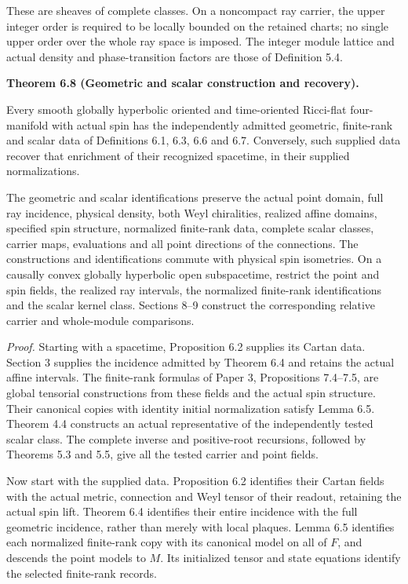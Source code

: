 \documentclass[
  english,
  11pt,
  reqno]{amsart}
\makeatletter
\newcommand{\pandocstatementheading}[1]{%
  \par\if@nobreak\else
    \addpenalty{\@beginparpenalty}%
    \addvspace{.5\baselineskip plus .2\baselineskip minus .2\baselineskip}%
  \fi
  {\normalfont\bfseries #1\par}%
  \nobreak\@afterindenttrue\@afterheading
}
\makeatother
\begin{document}
These are sheaves of complete classes. On a noncompact ray carrier, the
upper integer order is required to be locally bounded on the retained
charts; no single upper order over the whole ray space is imposed. The
integer module lattice and actual density and phase-transition factors
are those of Definition 5.4.

\pandocstatementheading{\protect{}\label{thm:global-geometric-scalar-recovery}Theorem 6.8 (Geometric and scalar construction and recovery).}

Every smooth globally hyperbolic oriented and time-oriented Ricci-flat
four-manifold with actual spin has the independently admitted geometric,
finite-rank and scalar data of Definitions 6.1, 6.3, 6.6 and 6.7.
Conversely, such supplied data recover that enrichment of their
recognized spacetime, in their supplied normalizations.

The geometric and scalar identifications preserve the actual point
domain, full ray incidence, physical density, both Weyl chiralities,
realized affine domains, specified spin structure, normalized
finite-rank data, complete scalar classes, carrier maps, evaluations and
all point directions of the connections. The constructions and
identifications commute with physical spin isometries. On a causally
convex globally hyperbolic open subspacetime, restrict the point and
spin fields, the realized ray intervals, the normalized finite-rank
identifications and the scalar kernel class. Sections 8--9 construct the
corresponding relative carrier and whole-module comparisons.

\emph{Proof.} Starting with a spacetime, Proposition 6.2 supplies its
Cartan data. Section 3 supplies the incidence admitted by Theorem 6.4
and retains the actual affine intervals. The finite-rank formulas of
Paper 3, Propositions 7.4--7.5, are global tensorial constructions from
these fields and the actual spin structure. Their canonical copies with
identity initial normalization satisfy Lemma 6.5. Theorem 4.4 constructs
an actual representative of the independently tested scalar class. The
complete inverse and positive-root recursions, followed by Theorems 5.3
and 5.5, give all the tested carrier and point fields.

Now start with the supplied data. Proposition 6.2 identifies their
Cartan fields with the actual metric, connection and Weyl tensor of
their readout, retaining the actual spin lift. Theorem 6.4 identifies
their entire incidence with the full geometric incidence, rather than
merely with local plaques. Lemma 6.5 identifies each normalized
finite-rank copy with its canonical model on all of \(F\), and descends
the point models to \(M\). Its initialized tensor and state equations
identify the selected finite-rank records.
\end{document}
